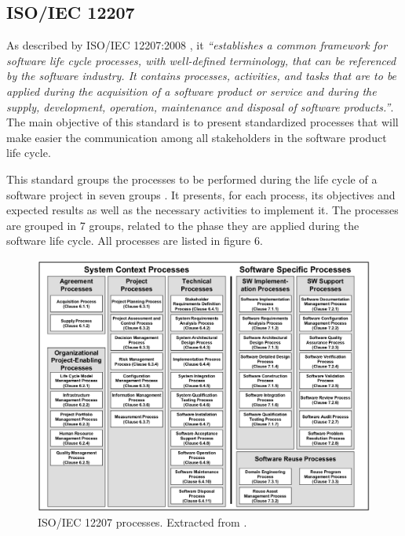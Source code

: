\subsection{ISO/IEC 12207}

As described by ISO/IEC 12207:2008 \cite{ISO12207}, it \textit{``establishes a common framework for software life cycle processes, with well-defined terminology, that can be referenced by the software industry. It contains processes, activities, and tasks that are to be applied during the acquisition of a software product or service and during the supply, development, operation, maintenance and disposal of software products.''}. The main objective of this standard is to present standardized processes that will make easier the communication among all stakeholders in the software product life cycle.\par
This standard groups the processes to be performed during the life cycle of a software project in seven groups . It presents, for each process, its objectives and expected results as well as the necessary activities to implement it. The processes are grouped in 7 groups, related to the phase they are applied during the software life cycle. All processes are listed in figure 6.\par
 
\begin{figure}[h!]
\centering
\includegraphics[width=\textwidth]{img/ISO12207Processes.png}
\caption{ISO/IEC 12207 processes. Extracted from \cite{ISO12207}.}
\end{figure}


